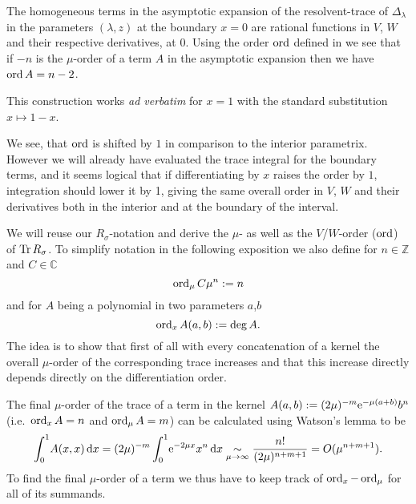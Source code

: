 \begin{MainTheorem}
  The homogeneous terms in the asymptotic expansion of the
  resolvent-trace of $\Delta_\lambda$ in the parameters $(\lambda,z)$ at the
  boundary $x = 0$ are rational functions in $V$, $W$ and their respective
  derivatives, at $0$. Using the order $\ord$ defined in  we
  see that if $-n$ is the $\mu$-order of a term $A$ in the asymptotic expansion
  then we have $\ord A = n - 2$.
  \begin{Remark}
    This construction works \emph{ad verbatim} for $x=1$ with the standard
    substitution $x\mapsto 1 - x$.
  \end{Remark}
  \begin{Remark}
    We see, that $\ord$ is shifted by $1$ in comparison to the interior
    parametrix. However we will already have evaluated the trace integral for
    the boundary terms, and it seems logical that if differentiating by $x$
    raises the order by $1$, integration should lower it by 1, giving the same
    overall order in $V$, $W$ and their derivatives both in the interior and at
    the boundary of the interval.
  \end{Remark}
  \begin{Proof}
    We will reuse our $R_\sigma$-notation and derive the $\mu$- as well as the
    $V$/$W$-order ($\ord$) of $\Tr R_\sigma$. To simplify notation in the
    following exposition we also define for $n\in\mathbb{Z}$ and
    $C\in\mathbb{C}$
    \begin{equation}
      \ord_\mu C\mu^n := n
    \end{equation}
    and for $A$ being a polynomial in two parameters $a$,$b$
    \begin{equation}
      \ord_x A(a,b) := \deg A.
    \end{equation}
    The idea is to show that first of all with every concatenation of a kernel
    the overall $\mu$-order of the corresponding trace increases and that this
    increase directly depends directly on the differentiation order.

    The final $\mu$-order of the trace of a term in the kernel $A(a,b) :=
    (2\mu)^{-m}\Eto{-\mu(a+b)}b^n$ (i.e.\ $\ord_x A = n$ and $\ord_\mu A = m$) can
    be calculated using Watson's lemma to be
    \begin{equation}
      \Int{x}{A(x,x)} = (2\mu)^{-m}\Int{x}{\Eto{-2\mu x}x^n} \SimMu
      \frac{n!}{(2\mu)^{n+m+1}} = O(\mu^{n+m+1}).
    \end{equation}
    To find the final $\mu$-order of a term we thus have to keep track of
    $\ord_x - \ord_\mu$ for all of its summands.


\end{Proof}
\end{MainTheorem}
